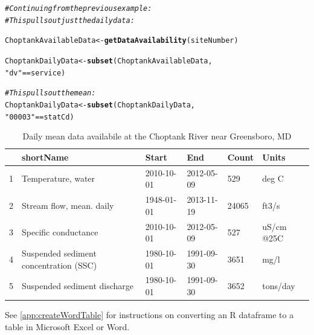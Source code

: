 \documentclass[a4paper,11pt]{article}\usepackage[]{graphicx}\usepackage[]{color}
\makeatletter
\newcommand{\hlstr}[1]{\textcolor[rgb]{0.192,0.494,0.8}{#1}}%
\newcommand{\hlcom}[1]{\textcolor[rgb]{0.678,0.584,0.686}{\textit{#1}}}%
\newcommand{\hlopt}[1]{\textcolor[rgb]{0,0,0}{#1}}%
\newcommand{\hlstd}[1]{\textcolor[rgb]{0.345,0.345,0.345}{#1}}%
\newcommand{\hlkwb}[1]{\textcolor[rgb]{0.69,0.353,0.396}{#1}}%
\newcommand{\hlkwd}[1]{\textcolor[rgb]{0.737,0.353,0.396}{\textbf{#1}}}%
\newenvironment{kframe}{%
 \def\at@end@of@kframe{}%
 \ifinner\ifhmode%
  \def\at@end@of@kframe{\end{minipage}}%
  \begin{minipage}{\columnwidth}%
 \fi\fi%
 \def\FrameCommand##1{\hskip\@totalleftmargin \hskip-\fboxsep
 \colorbox{shadecolor}{##1}\hskip-\fboxsep
     \hskip-\linewidth \hskip-\@totalleftmargin \hskip\columnwidth}%
 \MakeFramed {\advance\hsize-\width
   \@totalleftmargin\z@ \linewidth\hsize
   \@setminipage}}%
 {\par\unskip\endMakeFramed%
 \at@end@of@kframe}
\newenvironment{knitrout}{}{} %
\makeatother
\begin{document}
\begin{knitrout}
\color{fgcolor}\begin{kframe}
\begin{alltt}
\hlcom{# Continuing from the previous example:}
\hlcom{# This pulls out just the daily data:}

\hlstd{ChoptankAvailableData} \hlkwb{<-} \hlkwd{getDataAvailability}\hlstd{(siteNumber)}

\hlstd{ChoptankDailyData} \hlkwb{<-} \hlkwd{subset}\hlstd{(ChoptankAvailableData,}
                            \hlstr{"dv"} \hlopt{==} \hlstd{service)}

\hlcom{# This pulls out the mean:}
\hlstd{ChoptankDailyData} \hlkwb{<-} \hlkwd{subset}\hlstd{(ChoptankDailyData,}
                            \hlstr{"00003"} \hlopt{==} \hlstd{statCd)}
\end{alltt}
\end{kframe}
\end{knitrout}


\begin{table}[ht]
\centering
\begin{tabular}{rlllll}
  \hline
 & shortName & Start & End & Count & Units \\ 
  \hline
1 & Temperature, water & 2010-10-01 & 2012-05-09 & 529 & deg C \\ 
  2 & Stream flow, mean. daily & 1948-01-01 & 2013-11-19 & 24065 & ft3/s \\ 
  3 & Specific conductance & 2010-10-01 & 2012-05-09 & 527 & uS/cm @25C \\ 
  4 & Suspended sediment concentration (SSC) & 1980-10-01 & 1991-09-30 & 3651 & mg/l \\ 
  5 & Suspended sediment discharge & 1980-10-01 & 1991-09-30 & 3652 & tons/day \\ 
   \hline
\end{tabular}
\caption{Daily mean data availabile at the Choptank River near Greensboro, MD} 
\label{tab:gda}
\end{table}



See \ref{app:createWordTable} for instructions on converting an R dataframe to a table in Microsoft Excel or Word.

\FloatBarrier

\end{document}
